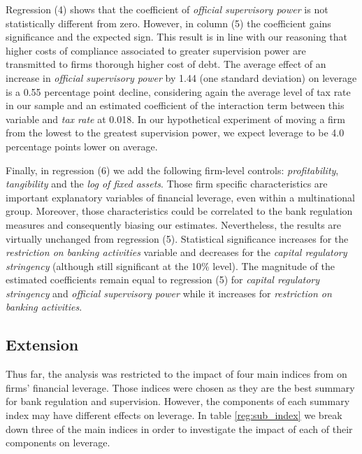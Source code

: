 \documentclass[12pt]{article}
\begin{document}
	  Regression (4) shows that the coefficient of \textit{official supervisory power} is not statistically different from zero. However, in column (5) the coefficient gains significance and the expected sign. This result is in line with our reasoning that higher costs of compliance associated to greater supervision power are transmitted to firms thorough higher cost of debt. The average effect of an increase in \textit{official supervisory power} by 1.44 (one standard deviation) on leverage is a 0.55 percentage point decline, considering again the average level of tax rate in our sample and an estimated coefficient of the interaction term between this variable and \textit{tax rate} at 0.018. In our hypothetical experiment of moving a firm from the lowest to the greatest supervision power, we expect leverage to be 4.0 percentage points lower on average.
	
	  Finally, in regression (6) we add the following firm-level controls: \textit{profitability}, \textit{tangibility} and the \textit{log of fixed assets}. Those firm specific characteristics are important explanatory variables of financial leverage, even within a multinational group. Moreover, those characteristics could be correlated to the bank regulation measures and consequently biasing our estimates. Nevertheless, the results are virtually unchanged from regression (5). Statistical significance increases for the \textit{restriction on banking activities} variable and decreases for the \textit{capital regulatory stringency} (although still significant at the 10\% level). The magnitude of the estimated coefficients remain equal to regression (5) for \textit{capital regulatory stringency} and \textit{official supervisory power} while it increases for \textit{restriction on banking activities}.
	   	    			   		
\subsection{Extension} \label{sec:sub_index}

Thus far, the analysis was restricted to the impact of four main indices from \cite{barth2013bank} on firms' financial leverage. Those indices were chosen as they are the best summary for bank regulation and supervision. However, the components of each summary index may have different effects on leverage. In table \ref{reg:sub_index} we break down three of the main indices in order to investigate the impact of each of their components on leverage.
\end{document}
